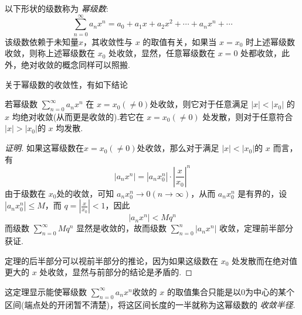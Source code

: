 以下形状的级数称为 \emph{幂级数}:
\[ \sum_{n=0}^{\infty} a_nx^n = a_0+a_1x+a_2x^2+\cdots + a_nx^n+\cdots \]
该级数依赖于未知量$x$，其收敛性与 $x$ 的取值有关，如果当 $x=x_0$ 时上述幂级数收敛，则称上述幂级数在 $x_0$ 处收敛，显然，任意幂级数在 $x=0$ 处都收敛，此外，绝对收敛的概念同样可以照搬.

关于幂级数的收敛性，有如下结论
\begin{theorem}
  若幂级数 $\sum_{n=0}^{\infty}a_nx^n$ 在 $x=x_0(\neq 0)$处收敛，则它对于任意满足 $|x|<|x_0|$ 的 $x$ 均绝对收敛(从而更是收敛的).若它在 $x=x_0(\neq 0)$ 处发散，则对于任意符合 $|x|>|x_0|$的 $x$ 均发散.
\end{theorem}

\begin{proof}[证明]
  如果这幂级数在$x=x_0(\neq 0)$处收敛，那么对于满足 $|x|<|x_0|$的 $x$ 而言，有
  \[ |a_nx^n| = |a_nx_0^n| \cdot \left| \frac{x}{x_0} \right|^n \]
  由于级数在 $x_0$处的收敛，可知 $a_nx_0^n \to 0 (n \to \infty)$，从而 $a_nx_0^n$ 是有界的，设 $|a_nx_0^n| \leqslant M$，而 $q=\left| \frac{x}{x_0} \right| < 1$，因此
  \[ |a_nx^n| < Mq^n \]
  而级数 $\sum_{n=0}^{\infty} Mq^n$ 显然是收敛的，故而级数 $\sum_{n=0}^n|a_nx^n|$ 收敛，定理前半部分获证.

  定理的后半部分可以视前半部分的推论，因为如果这级数在 $x_0$ 处发散而在绝对值更大的 $x$ 处收敛，显然与前部分的结论是矛盾的.
\end{proof}

这定理显示能使幂级数 $\sum_{n=0}^{\infty} a_nx^n$收敛的 $x$ 的取值集合只能是以$0$为中心的某个区间(端点处的开闭暂不清楚)，将这区间长度的一半就称为这幂级数的 \emph{收敛半径}.

